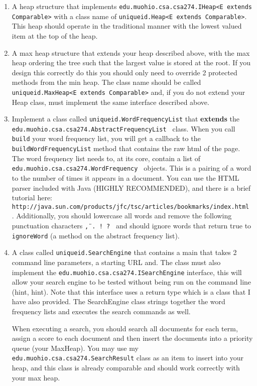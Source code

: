 \documentclass[10pt]{exam}
\begin{document}
\begin{enumerate}
	\item A heap structure that implements {\tt edu.muohio.csa.csa274.IHeap<E extends Comparable>} with a class name of {\tt uniqueid.Heap<E extends Comparable>}.   This heap should operate in the traditional manner with the lowest valued item at the top of the heap.
	
	\item A max heap structure that extends your heap described above, with the max heap ordering the tree such that the largest value is stored at the root.  If you design this correctly do this you should only need to override 2 protected methods from the min heap.   The class name should be called {\tt uniqueid.MaxHeap<E extends Comparable>} and, if you do not extend your Heap class, must implement the same interface described above. 
	
	\item Implement a class called {\tt uniqueid.WordFrequencyList} that {\bf extends } the {\tt edu.muohio.csa.csa274.AbstractFrequencyList } class.   When you call {\tt build} your word frequency list, you will get a callback to the {\tt buildWordFrequencyList} method that contains the raw html of the page.  The word frequency list needs to, at its core, contain a list of {\tt edu.muohio.csa.csa274.WordFrequency } objects.   This is a pairing of a word to the number of times it appears in a document.  You can use the HTML parser included with Java (HIGHLY RECOMMENDED), and there is a brief tutorial here: {\tt http://java.sun.com/products/jfc/tsc/articles/bookmarks/index.html }.   Additionally, you should lowercase all words and remove the following punctuation characters {\tt \" , . ! ? } and should ignore words that return true to {\tt ignoreWord} (a method on the abstract frequency list).
	
	\item A class called {\tt uniqueid.SearchEngine} that contains a main that takes 2 command line parameters, a starting URL and.   The class must also implement the {\tt edu.muohio.csa.csa274.ISearchEngine} interface, this will allow your search engine to be tested without being run on the command line (hint, hint).   Note that this interface uses a return type which is a class that I have also provided.   The SearchEngine class strings together the word frequency lists and executes the search commands as well.
	\par
	When executing a search, you should search all documents for each term, assign a score to each document and then insert the documents into a priority queue (your MaxHeap).   You may use my {\tt edu.muohio.csa.csa274.SearchResult} class as an item to insert into your heap, and this class is already comparable and should work correctly with your max heap.
	
\end{enumerate}
\end{document}
